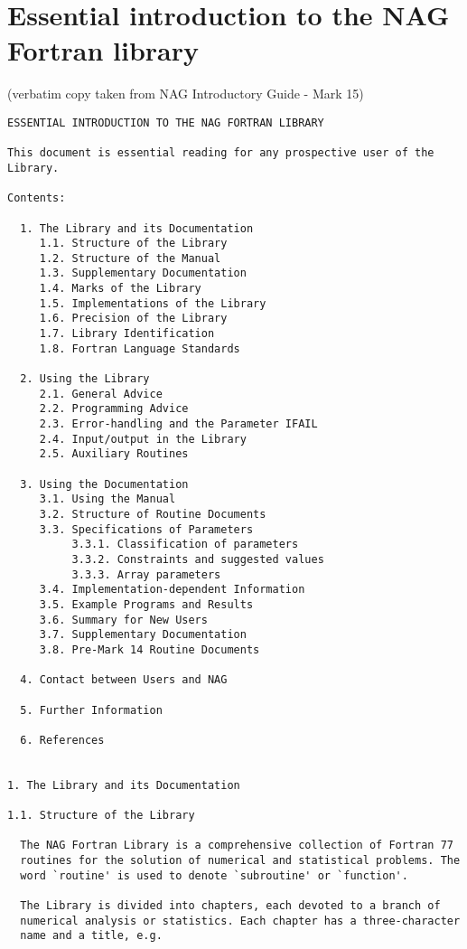 \chapter{Essential introduction to the NAG Fortran library}
\begin{center}
   (verbatim copy taken from NAG Introductory Guide - Mark 15)
\end{center}
\begin{verbatim}
ESSENTIAL INTRODUCTION TO THE NAG FORTRAN LIBRARY
 
This document is essential reading for any prospective user of the
Library.
 
Contents:
 
  1. The Library and its Documentation
     1.1. Structure of the Library
     1.2. Structure of the Manual
     1.3. Supplementary Documentation
     1.4. Marks of the Library
     1.5. Implementations of the Library
     1.6. Precision of the Library
     1.7. Library Identification
     1.8. Fortran Language Standards
 
  2. Using the Library
     2.1. General Advice
     2.2. Programming Advice
     2.3. Error-handling and the Parameter IFAIL
     2.4. Input/output in the Library
     2.5. Auxiliary Routines
 
  3. Using the Documentation
     3.1. Using the Manual
     3.2. Structure of Routine Documents
     3.3. Specifications of Parameters
          3.3.1. Classification of parameters
          3.3.2. Constraints and suggested values
          3.3.3. Array parameters
     3.4. Implementation-dependent Information
     3.5. Example Programs and Results
     3.6. Summary for New Users
     3.7. Supplementary Documentation
     3.8. Pre-Mark 14 Routine Documents
 
  4. Contact between Users and NAG
 
  5. Further Information
 
  6. References
 
 
1. The Library and its Documentation
 
1.1. Structure of the Library
 
  The NAG Fortran Library is a comprehensive collection of Fortran 77
  routines for the solution of numerical and statistical problems. The
  word `routine' is used to denote `subroutine' or `function'.
 
  The Library is divided into chapters, each devoted to a branch of
  numerical analysis or statistics. Each chapter has a three-character
  name and a title, e.g.
 

\end{verbatim}
